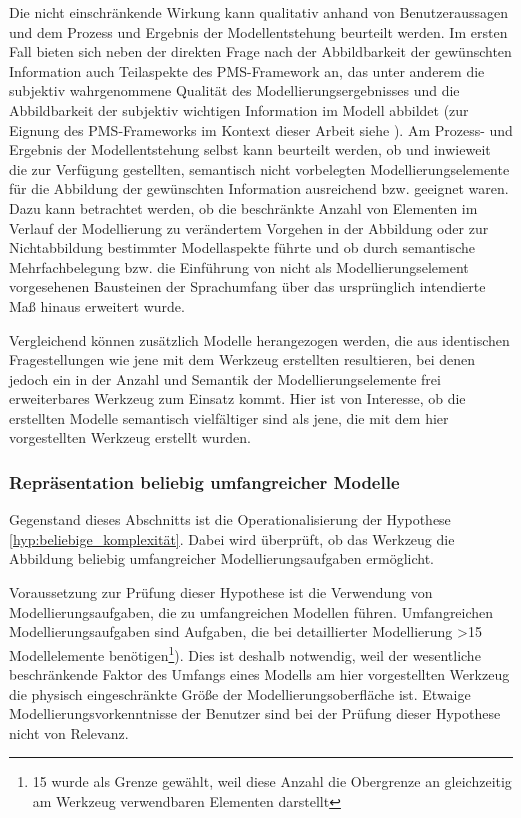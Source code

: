 Die nicht einschränkende Wirkung kann qualitativ anhand von Benutzeraussagen und dem Prozess und Ergebnis der Modellentstehung beurteilt werden. Im ersten Fall bieten sich neben der direkten Frage nach der Abbildbarkeit der gewünschten Information auch Teilaspekte des \gls{PMS}-Framework \citep{Sedera02} an, das unter anderem die subjektiv wahrgenommene Qualität des Modellierungsergebnisses und die Abbildbarkeit der subjektiv wichtigen Information im Modell abbildet (zur Eignung des \gls{PMS}-Frameworks im Kontext dieser Arbeit siehe \citep{Wahlmuller10}). Am Prozess- und Ergebnis der Modellentstehung selbst kann beurteilt werden, ob und inwieweit die zur Verfügung gestellten, semantisch nicht vorbelegten Modellierungselemente für die Abbildung der gewünschten Information ausreichend bzw. geeignet waren. Dazu kann betrachtet werden, ob die beschränkte Anzahl von Elementen im Verlauf der Modellierung zu verändertem Vorgehen in der Abbildung oder zur Nichtabbildung bestimmter Modellaspekte führte und ob durch semantische Mehrfachbelegung bzw. die Einführung von nicht als Modellierungselement vorgesehenen Bausteinen der Sprachumfang über das ursprünglich intendierte Maß hinaus erweitert wurde. 

Vergleichend können zusätzlich Modelle herangezogen werden, die aus identischen Fragestellungen wie jene mit dem Werkzeug erstellten resultieren, bei denen jedoch ein in der Anzahl und Semantik der Modellierungselemente frei erweiterbares Werkzeug zum Einsatz kommt. Hier ist von Interesse, ob die erstellten Modelle semantisch vielfältiger sind als jene, die mit dem hier vorgestellten Werkzeug erstellt wurden.


\subsubsection{Repräsentation beliebig umfangreicher Modelle} %
\label{ssub:repräsentation_beliebig_komplexer_modelle}

Gegenstand dieses Abschnitts ist die Operationalisierung der Hypothese \ref{hyp:beliebige_komplexität}. Dabei wird überprüft, ob das Werkzeug die Abbildung beliebig umfangreicher Modellierungsaufgaben ermöglicht.

Voraussetzung zur Prüfung dieser Hypothese ist die Verwendung von Modellierungsaufgaben, die zu umfangreichen Modellen führen. Umfangreichen Modellierungsaufgaben sind Aufgaben, die bei detaillierter Modellierung >15 Modellelemente benötigen\footnote{15 wurde als Grenze gewählt, weil diese Anzahl die Obergrenze an gleichzeitig am Werkzeug verwendbaren Elementen darstellt}). Dies ist deshalb notwendig, weil der wesentliche beschränkende Faktor des Umfangs eines Modells am hier vorgestellten Werkzeug die physisch eingeschränkte Größe der Modellierungsoberfläche ist. Etwaige Modellierungsvorkenntnisse der Benutzer sind bei der Prüfung dieser Hypothese nicht von Relevanz.

